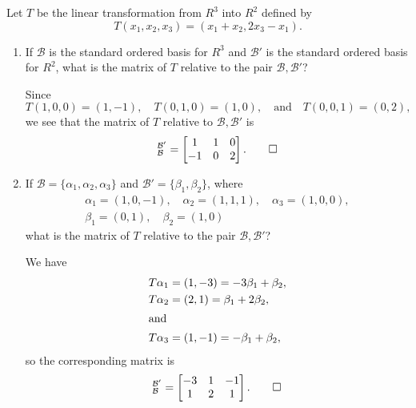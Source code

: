  Let $T$ be the linear transformation from $R^3$ into $R^2$
defined by
\begin{equation*}
  T(x_1,x_2,x_3) = (x_1 + x_2, 2x_3 - x_1).
\end{equation*}
\begin{enumerate}
\item If $\mathcal{B}$ is the standard ordered basis for $R^3$ and
  $\mathcal{B}'$ is the standard ordered basis for $R^2$, what is the
  matrix of $T$ relative to the pair $\mathcal{B},\mathcal{B}'$?
  \begin{solution}
    Since
    \begin{equation*}
      T(1, 0, 0) = (1, -1), \quad
      T(0, 1, 0) = (1, 0), \quad\text{and}\quad
      T(0, 0, 1) = (0, 2),
    \end{equation*}
    we see that the matrix of $T$ relative to
    $\mathcal{B},\mathcal{B}'$ is
    \begin{equation*}
      [T]_{\mathcal{B}}^{\mathcal{B}'} =
      \begin{bmatrix}
        1 & 1 & 0 \\
        -1 & 0 & 2
      \end{bmatrix}. \qedhere
    \end{equation*}
  \end{solution}

\item If $\mathcal{B} = \{\alpha_1,\alpha_2,\alpha_3\}$ and
  $\mathcal{B}' = \{\beta_1,\beta_2\}$, where
  \begin{multline*}
    \alpha_1 = (1, 0, -1), \quad
    \alpha_2 = (1, 1, 1), \quad
    \alpha_3 = (1, 0, 0), \\
    \beta_1 = (0, 1), \quad
    \beta_2 = (1, 0)
  \end{multline*}
  what is the matrix of $T$ relative to the pair
  $\mathcal{B},\mathcal{B}'$?
  \begin{solution}
    We have
    \begin{align*}
      T\alpha_1 &= (1, -3) = -3\beta_1 + \beta_2, \\
      T\alpha_2 &= (2, 1) = \beta_1 + 2\beta_2, \\
      \intertext{and}
      T\alpha_3 &= (1, -1) = -\beta_1 + \beta_2,
    \end{align*}
    so the corresponding matrix is
    \begin{equation*}
      [T]_{\mathcal{B}}^{\mathcal{B}'} =
      \begin{bmatrix}
        -3 & 1 & -1 \\
        1 & 2 & 1
      \end{bmatrix}. \qedhere
    \end{equation*}
  \end{solution}
\end{enumerate}

